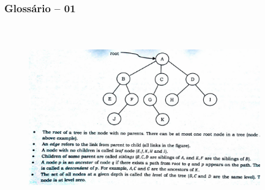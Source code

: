 \begin{frame}

    \frametitle{Glossário -- 01}
    
     \begin{figure}[!ht]
     \centering
    \includegraphics[width=10cm, height=8cm]{figs/fig_arvores/glossario_arv_01.jpg}
    \end{figure}

\end{frame}


